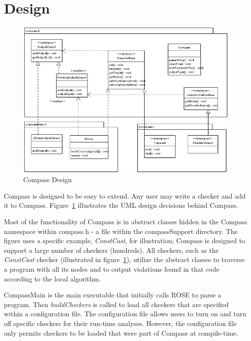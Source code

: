 \section{Design}

\begin{figure}[thb]
\hspace{-1.5in}
\includegraphics[width=7in]{compassdesign.png}
\caption{Compass Design}
\label{CompassDesign}
\end{figure}

Compass is designed to be easy to extend. Any user may write a checker and add it to
Compass. Figure~\ref{CompassDesign} illustrates the UML design decisions behind Compass.


Most of the functionality of Compass is in abstract classes hidden in the Compass
namespace within compass.h - a file within the compassSupport directory. The figure uses a
specific example, {\em ConstCast}, for illustration; Compass is designed to support a large
number of checkers (hundreds). All checkers, such as the {\em ConstCast} checker (illustrated in
figure~\ref{CompassDesign}), utilize the abstract classes to traverse a program with all
its nodes and to output violations found in that code according to the local algorithm.

CompassMain is the main executable that initially calls ROSE to parse a program. Then
\emph{buildCheckers} is called to load all checkers that are specified within a
configuration file. The configuration file allows users to turn on and turn off specific
checkers for their run-time analyses. However, the configuration file only permits
checkers to be loaded that were part of Compass at compile-time.

